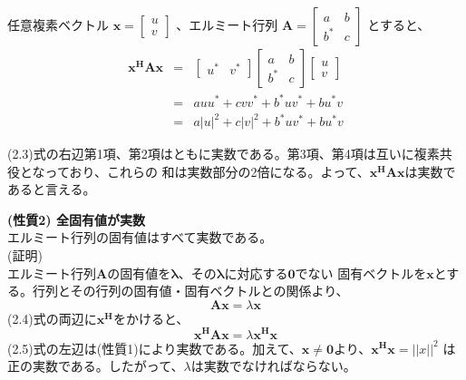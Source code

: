 任意複素ベクトル
$
    \bm{x} = \left[
        \begin{array}{c}
            u \\
            v
        \end{array}
    \right]
$
、エルミート行列
$
    \bm{A} = \left[
        \begin{array}{cc}
            a & b \\
            b^* & c
        \end{array}
    \right]
$
とすると、
\begin{eqnarray}
    \bm{x^HAx} &=& 
    \left[
        \begin{array}{cc}
            u^* & v^*
        \end{array}
    \right]
    \left[
        \begin{array}{cc}
            a & b \\
            b^* & c
        \end{array}
    \right]
    \left[
        \begin{array}{c}
            u \\
            v
        \end{array}
    \right] \nonumber \\
    &=& auu^* + cvv^* + b^*uv^* + bu^*v \nonumber \\
    &=& a|u|^2+c|v|^2+b^*uv^*+bu^*v
\end{eqnarray}

\noindent(2.3)式の右辺第1項、第2項はともに実数である。第3項、第4項は互いに複素共役となっており、これらの
和は実数部分の2倍になる。よって、$\bm{x^HAx}$は実数であると言える。

\vspace{5mm}
\noindent\textbf{(性質2) \quad 全固有値が実数} \\
エルミート行列の固有値はすべて実数である。 \\
\vspace{3mm}
(証明) \\
エルミート行列$\bm{A}$の固有値を$\bm{\lambda}$、その$\bm{\lambda}$に対応する$\bm{0}$でない
固有ベクトルを$\bm{x}$とする。行列とその行列の固有値・固有ベクトルとの関係より、
\begin{equation}
    \bm{Ax} = \lambda\bm{x}
\end{equation}
(2.4)式の両辺に$\bm{x^H}$をかけると、
\begin{equation}
    \bm{x^HAx} = \lambda\bm{x^Hx}
\end{equation}
(2.5)式の左辺は(性質1)により実数である。加えて、$\bm{x}\neq\bm{0}$より、$\bm{x^Hx}=||x||^2$
は正の実数である。したがって、$\lambda$は実数でなければならない。

